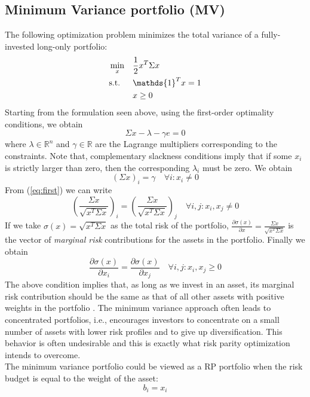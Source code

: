\subsection{Minimum Variance portfolio (MV)}
The following optimization problem minimizes the total variance of a fully-invested long-only portfolio:
\begin{equation}
\begin{aligned}
& \min_x
&& \frac{1}{2}x^T \Sigma x\vspace{-0.8em}\\
&\text{s.t.}
&&\mathds{1}^T x =1\\
&&&x \geq 0
\end{aligned}
\end{equation}
Starting from the formulation seen above, using the first-order optimality conditions, we obtain
\begin{equation}
\Sigma x - \lambda - \gamma e = 0
\end{equation}
where $\lambda \in \mathbb{R}^n$ and $\gamma \in \mathbb{R}$ are the Lagrange multipliers corresponding to the constraints. Note that, complementary slackness conditions imply that if some $x_i$ is strictly larger than zero, then the corresponding $\lambda_i$ must be zero. We obtain
\begin{equation}\label{eq:first}
(\Sigma x)_i = \gamma \quad \forall i: x_i \neq 0
\end{equation}
From (\ref{eq:first}) we can write
\begin{equation}
\left(\frac{\Sigma x}{\sqrt{x^T \Sigma x}}\right)_i = \left(\frac{\Sigma x}{\sqrt{x^T \Sigma x}}\right)_j \quad \forall i,j: x_i,x_j \neq 0 
\end{equation}
If we take $\sigma (x) = \sqrt{x^T \Sigma x}$ as the total risk of the portfolio, $\frac{\partial\sigma (x)}{\partial x} = \frac{\Sigma x}{\sqrt{x^T \Sigma x}}$ is the vector of \textit{marginal risk} contributions for the assets in the portfolio. Finally we obtain
\begin{equation}\label{eq:erc1}
\frac{\partial\sigma(x)}{\partial x_i} = \frac{\partial\sigma(x)}{\partial x_j}\quad \forall i,j: x_i,x_j \geq 0
\end{equation}
The above condition implies that, as long as we invest in an asset, its marginal risk contribution should be the same as that of all other assets with positive weights in the portfolio \cite{tutuncu}. The minimum variance approach often leads to concentrated portfolios, i.e., encourages investors to concentrate on a small number of assets with lower risk profiles and to give up diversification. This behavior is often undesirable and this is exactly what risk parity optimization intends to overcome.\\
The minimum variance portfolio could be viewed as a RP portfolio when the risk budget is equal to the weight of the asset\footnotemark[2]:
\begin{equation*}
b_i = x_i
\end{equation*}

